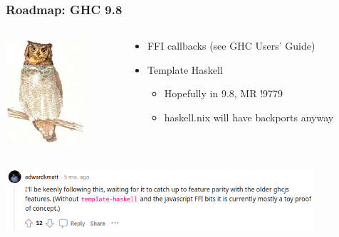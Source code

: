 \documentclass{beamer}
\begin{document}
\begin{frame}
\frametitle{Roadmap: GHC 9.8}
\begin{columns}

\begin{column}{0.3\textwidth}
\begin{center}
\includegraphics[height=4cm]{images/owl3.png}
\end{center}
\end{column}

\begin{column}{0.6\textwidth}
\begin{itemize}
\item FFI callbacks (see GHC Users' Guide)
\item Template Haskell
\begin{itemize}
\item Hopefully in 9.8, MR !9779
\item haskell.nix will have backports anyway
\end{itemize}
\end{itemize}
\end{column}

\end{columns}
\begin{center}
\includegraphics[height=2.3cm]{images/kmett.png}
\end{center}
\end{frame}
\end{document}
